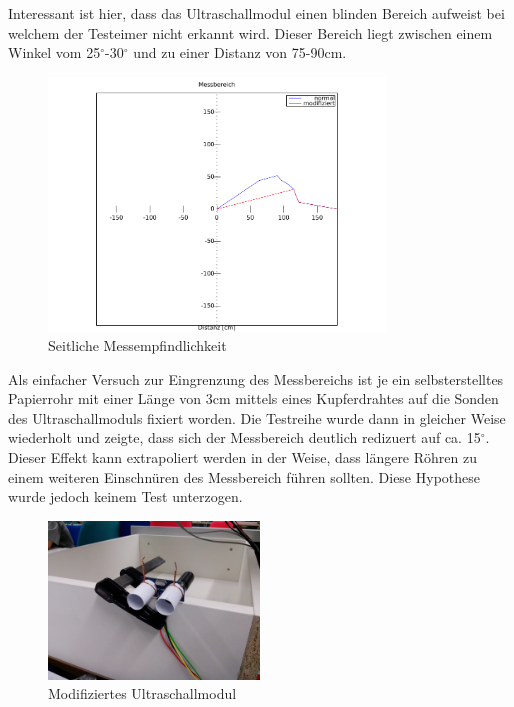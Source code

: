 Interessant ist hier, dass das Ultraschallmodul einen blinden Bereich aufweist
bei welchem der Testeimer nicht erkannt wird. Dieser Bereich liegt zwischen 
einem Winkel vom 25$^\circ$-30$^\circ$ und zu einer Distanz von 75-90cm.

\begin{figure}[h!]
	\centering
	\includegraphics[width=0.8\textwidth]{../../fig/hc-sr04_range.pdf}
	\caption{Seitliche Messempfindlichkeit}
	\label{fig:sideresponse}
\end{figure}

Als einfacher Versuch zur Eingrenzung des Messbereichs ist je ein 
selbsterstelltes Papierrohr mit einer Länge von 3cm mittels eines 
Kupferdrahtes auf die Sonden des Ultraschallmoduls fixiert worden. 
Die Testreihe wurde dann in gleicher Weise wiederholt und zeigte, dass
sich der Messbereich deutlich redizuert auf ca. 15$^\circ$. Dieser Effekt 
kann extrapoliert werden in der Weise, dass längere Röhren zu einem weiteren 
Einschnüren des Messbereich führen sollten. Diese Hypothese wurde jedoch
keinem Test unterzogen.

\begin{figure}[h!]
	\centering
	\includegraphics[width=0.5\textwidth]{../../fig/HC-SR04_08.jpg}
	\caption{Modifiziertes Ultraschallmodul}
\end{figure}

